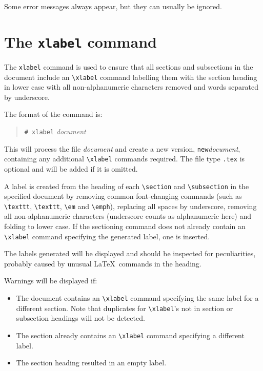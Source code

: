 \documentclass[twoside,11pt,nolof]{starlink}
\begin{document}
Some error messages always appear, but they can usually be ignored.

\newpage
\section{\label{xlabel}The \texttt{xlabel} command}
The \texttt{xlabel} command is used to ensure that all sections and subsections
in the document include an \verb+\xlabel+ command labelling them with the
section heading in lower case with all non-alphanumeric characters removed and
words separated by underscore.

The format of the command is:
\begin{quote}
\verb+# xlabel+ \textit{document}
\end{quote}

This will process the file \textit{document} and create a new version,
\texttt{new}\textit{document}, containing any additional \verb+\xlabel+
commands required. The file type \texttt{.tex} is optional and will be added
if it is omitted.

A label is created from the heading of each \verb+\section+ and
\verb+\subsection+ in the specified document by removing common font-changing
commands (such as \verb+\texttt+, \verb+\texttt+, \verb+\em+ and \verb+\emph+),
replacing all spaces by underscore, removing all non-alphanumeric characters
(underscore counts as alphanumeric here) and folding to lower case.
If the sectioning command does not already contain an \verb+\xlabel+ command
specifying the generated label, one is inserted.

The labels generated will be displayed and should be inspected for
peculiarities, probably caused by unusual \LaTeX\ commands in the heading.

Warnings will be displayed if:
\begin{itemize}
\item The document contains an \verb+\xlabel+ command specifying the same
label for a different section. Note that duplicates for \verb+\xlabel+'s not
in section or subsection headings will not be detected.
\item The section already contains an \verb+\xlabel+ command specifying
a different label.
\item The section heading resulted in an empty label.
\end{itemize}
\end{document}
